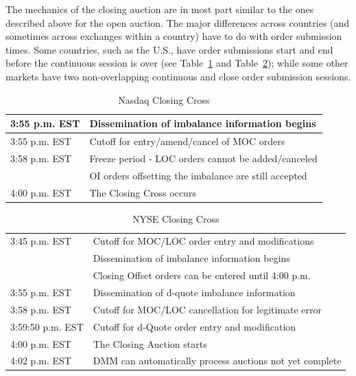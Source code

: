 The mechanics of the closing auction are in most part similar to the ones described above for the open auction. The major differences across countries (and sometimes across exchanges within a country) have to do with order submission times. Some countries, such as the U.S., have order submissions start and end before the continuous session is over (see Table~\ref{tab:NASDAQclose} and Table~\ref{tab:NYSEclose}); while some other markets have two non-overlapping continuous and close order submission sessions.

	\begin{table}[!ht]
   	\centering
   	\caption{Nasdaq Closing Cross\label{tab:NASDAQclose}}
   	\begin{tabular}{ll} 
	3:55 p.m. EST & Dissemination of imbalance information begins  \\ \hline
	3:55 p.m. EST & Cutoff for entry/amend/cancel of MOC orders\\ \hline
	3:58 p.m. EST & Freeze period - LOC orders cannot be added/canceled  \\ 
	 & OI orders offsetting the imbalance are still accepted   \\ \hline	
	4:00 p.m. EST & The Closing Cross occurs		
  	 \end{tabular}
	\end{table}	


	\begin{table}[!ht]
   	\centering
   	\caption{NYSE Closing Cross\label{tab:NYSEclose}}
   	\begin{tabular}{ll} 
	3:45 p.m. EST & Cutoff for MOC/LOC order entry and modifications  \\ 
     	& Dissemination of imbalance information begins \\
	& Closing Offset orders can be entered until 4:00 p.m.  \\ \hline	 
	3:55 p.m. EST &  Dissemination of d-quote imbalance information\\ \hline
	3:58 p.m. EST & Cutoff for MOC/LOC cancellation for legitimate error \\ \hline
	3:59:50 p.m. EST & Cutoff for d-Quote order entry and modification \\ \hline
	4:00 p.m. EST & The Closing Auction starts \\ \hline
	4:02 p.m. EST & DMM can automatically process auctions not yet complete
   	\end{tabular}
	\end{table}	


